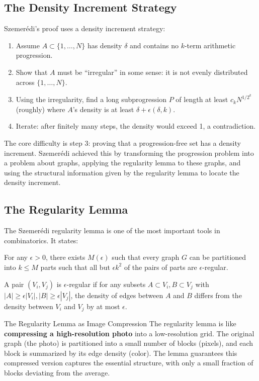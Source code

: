 \subsection{The Density Increment Strategy}

Szemer\'edi's proof uses a density increment strategy:
\begin{enumerate}
\item Assume $A \subset \{1,\ldots,N\}$ has density $\delta$ and contains no $k$-term arithmetic progression.
\item Show that $A$ must be ``irregular'' in some sense: it is not evenly distributed across $\{1,\ldots,N\}$.
\item Using the irregularity, find a long subprogression $P$ of length at least $c_k N^{1/2^k}$ (roughly) where $A$'s density is at least $\delta + \epsilon(\delta, k)$.
\item Iterate: after finitely many steps, the density would exceed 1, a contradiction.
\end{enumerate}

The core difficulty is step 3: proving that a progression-free set has a density increment. Szemer\'edi achieved this by transforming the progression problem into a problem about graphs, applying the regularity lemma to these graphs, and using the structural information given by the regularity lemma to locate the density increment.

\subsection{The Regularity Lemma}

The Szemer\'edi regularity lemma is one of the most important tools in combinatorics. It states:

For any $\epsilon > 0$, there exists $M(\epsilon)$ such that every graph $G$ can be partitioned into $k \leq M$ parts such that all but $\epsilon k^2$ of the pairs of parts are $\epsilon$-regular.

A pair $(V_i, V_j)$ is $\epsilon$-regular if for any subsets $A \subset V_i, B \subset V_j$ with $|A| \geq \epsilon |V_i|, |B| \geq \epsilon |V_j|$, the density of edges between $A$ and $B$ differs from the density between $V_i$ and $V_j$ by at most $\epsilon$.

\begin{analogy}{The Regularity Lemma as Image Compression}
The regularity lemma is like \textbf{compressing a high-resolution photo} into a low-resolution grid. The original graph (the photo) is partitioned into a small number of blocks (pixels), and each block is summarized by its edge density (color). The lemma guarantees this compressed version captures the essential structure, with only a small fraction of blocks deviating from the average.
\end{analogy}

